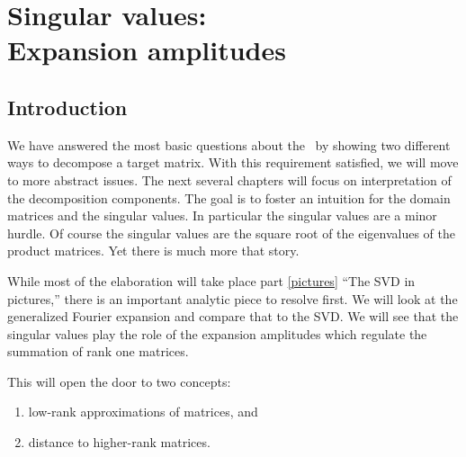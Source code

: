 \chapter[Singular values: Expansion amplitudes]{Singular values:\\ Expansion amplitudes}

\section{Introduction}
We have answered the most basic questions about the \svdp \ by showing two different ways to decompose a target matrix. With this requirement satisfied, we will move to more abstract issues. The next several chapters will focus on interpretation of the decomposition components. The goal is to foster an intuition for the domain matrices and the singular values. In particular the singular values are a minor hurdle. Of course the singular values are the square root of the eigenvalues of the product matrices. Yet there is much more that story.

While most of the elaboration will take place part \eqref{pictures} ``The SVD in pictures,'' there is an important analytic piece to resolve first. We will look at the generalized Fourier expansion and compare that to the SVD. We will see that the singular values play the role of the expansion amplitudes which regulate the summation of rank one matrices.

This will open the door to two concepts:
\begin{enumerate}
\item low-rank approximations of matrices, and
\item distance to higher-rank matrices.
\end{enumerate}




\endinput